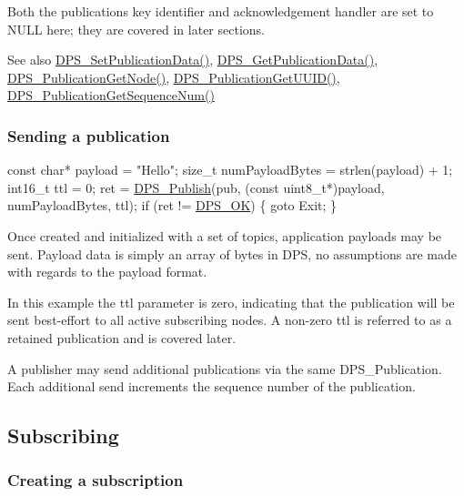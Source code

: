 Both the publication\textquotesingle{}s key identifier and acknowledgement handler are set to {\ttfamily N\+U\+LL} here; they are covered in later sections.

\begin{DoxySeeAlso}{See also}
\hyperlink{group__publication_ga91c46ccb6df7f4bb99ca5d9d35cc5a4a}{D\+P\+S\+\_\+\+Set\+Publication\+Data()}, \hyperlink{group__publication_gaa8bee35089ac62289c9ba0e6a0568ca0}{D\+P\+S\+\_\+\+Get\+Publication\+Data()}, \hyperlink{group__publication_gad2a37d52f12c93434b431eefd732f363}{D\+P\+S\+\_\+\+Publication\+Get\+Node()}, \hyperlink{group__publication_gaba1ad3ee807b75a1281d334be06a12f7}{D\+P\+S\+\_\+\+Publication\+Get\+U\+U\+I\+D()}, \hyperlink{group__publication_ga875b48217d861d4a9fa5471419d354e9}{D\+P\+S\+\_\+\+Publication\+Get\+Sequence\+Num()}
\end{DoxySeeAlso}
\hypertarget{tutorials-hello-world_sending-a-publication}{}\subsubsection{Sending a publication}\label{tutorials-hello-world_sending-a-publication}

\begin{DoxyCodeInclude}
    \textcolor{keyword}{const} \textcolor{keywordtype}{char}* payload = \textcolor{stringliteral}{"Hello"};
    \textcolor{keywordtype}{size\_t} numPayloadBytes = strlen(payload) + 1;
    int16\_t ttl = 0;
    ret = \hyperlink{group__publication_ga828a4efc5c235c48a81f6460cc3fe416}{DPS\_Publish}(pub, (\textcolor{keyword}{const} uint8\_t*)payload, numPayloadBytes, ttl);
    \textcolor{keywordflow}{if} (ret != \hyperlink{group__status_ga0ea3dd37bc558859ae0cb5a4f79a4bdd}{DPS\_OK}) \{
        \textcolor{keywordflow}{goto} Exit;
    \}
\end{DoxyCodeInclude}
 Once created and initialized with a set of topics, application payloads may be sent. Payload data is simply an array of bytes in D\+PS, no assumptions are made with regards to the payload format.

In this example the {\ttfamily ttl} parameter is zero, indicating that the publication will be sent best-\/effort to all active subscribing nodes. A non-\/zero ttl is referred to as a retained publication and is covered later.

A publisher may send additional publications via the same {\ttfamily D\+P\+S\+\_\+\+Publication}. Each additional send increments the sequence number of the publication.\hypertarget{tutorials-hello-world_subscribing}{}\subsection{Subscribing}\label{tutorials-hello-world_subscribing}
\hypertarget{tutorials-hello-world_creating-a-subscription}{}\subsubsection{Creating a subscription}\label{tutorials-hello-world_creating-a-subscription}

